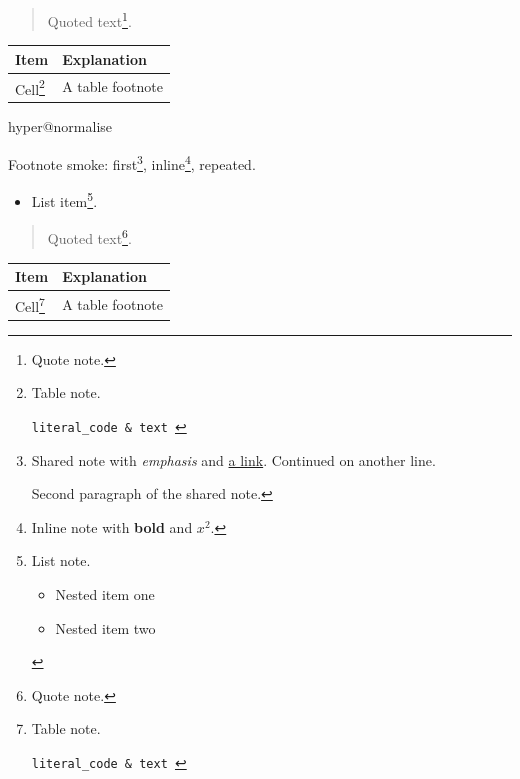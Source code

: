 \begin{quote}
Quoted text\footnote{Quote note.}.
\end{quote}

\par\addvspace{\medskipamount}
\noindent\begin{tabularx}{\linewidth}{@{}>{\raggedright\arraybackslash}X>{\raggedright\arraybackslash}X@{}}
\toprule
Item & Explanation \\
\midrule
Cell\footnote{\label{mark2tex:footnote:9a73ec147020e5f3f162908b134a7721:3}Table note.

\texttt{literal\_code \& text
}} & A table footnote \\
\bottomrule
\end{tabularx}
\par\addvspace{\medskipamount}




\ifcsname hyper@normalise\endcsname\else\PackageError{mark2tex}{Markdown links require hyperref}{Load \string\usepackage{hyperref} in the document preamble.}\fi
\begin{frame}[t]
Footnote smoke: first\footnote{\label{mark2tex:footnote:9a73ec147020e5f3f162908b134a7721:1}Shared note with \emph{emphasis} and \href{\detokenize{https://example.org/footnote}}{a link}.
Continued on another line.

Second paragraph of the shared note.}, inline\footnote{Inline note with \textbf{bold} and $x^2$.}, repeated.

\begin{itemize}
\item List item\footnote{\label{mark2tex:footnote:9a73ec147020e5f3f162908b134a7721:2}List note.

\begin{itemize}
\item Nested item one
\item Nested item two
\end{itemize}}.
\end{itemize}

\begin{quote}
Quoted text\footnote{Quote note.}.
\end{quote}

\par\addvspace{\medskipamount}
\noindent\begin{tabularx}{\linewidth}{@{}>{\raggedright\arraybackslash}X>{\raggedright\arraybackslash}X@{}}
\toprule
Item & Explanation \\
\midrule
Cell\footnote{\label{mark2tex:footnote:9a73ec147020e5f3f162908b134a7721:3}Table note.

\texttt{literal\_code \& text
}} & A table footnote \\
\bottomrule
\end{tabularx}
\par\addvspace{\medskipamount}




\end{frame}

